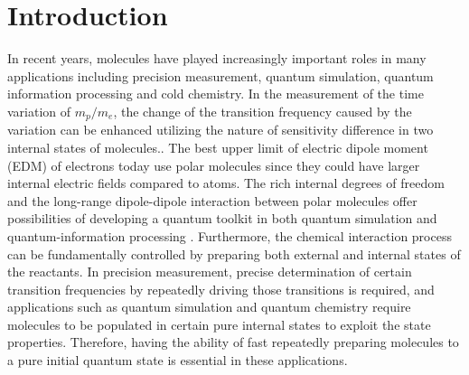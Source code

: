 \documentclass[nofootinbib,aip,jcp,reprint]{revtex4-1}
\begin{document}
\section{Introduction}
In recent years, molecules have played increasingly important roles in many applications including precision measurement\cite{kobayashi2019measurement, andreev2018improved, biesheuvel2016probing}, quantum simulation\cite{ohmori2017special}, quantum information processing\cite{grandstrand:2004, soderberg2009ultracold} and cold chemistry\cite{balakrishnan2016perspective, bohn2017cold}. In the measurement of the time variation of $m_p/m_e$, the change of the transition frequency caused by the variation can be enhanced utilizing the nature of sensitivity difference in two internal states of molecules.\cite{demille2008enhanced, kobayashi2019measurement, kokish2018prospects, stollenwerk2018optical}. The best upper limit of electric dipole moment (EDM) of electrons today use polar molecules\cite{andreev2018improved} since they could have larger internal electric fields compared to atoms. The rich internal degrees of freedom and the long-range dipole-dipole interaction between polar molecules offer possibilities of developing a quantum toolkit in both quantum simulation and quantum-information processing \cite{wei2011entanglement}. Furthermore, the chemical interaction process can be fundamentally controlled by preparing both external and internal states of the reactants\cite{de2011controlling}. In precision measurement, precise determination of certain transition frequencies by repeatedly driving those transitions is required, and applications such as quantum simulation and quantum chemistry require molecules to be populated in certain pure internal states to exploit the state properties. Therefore, having the ability of fast repeatedly preparing molecules to a pure initial quantum state is essential in these applications.\par
\end{document}
